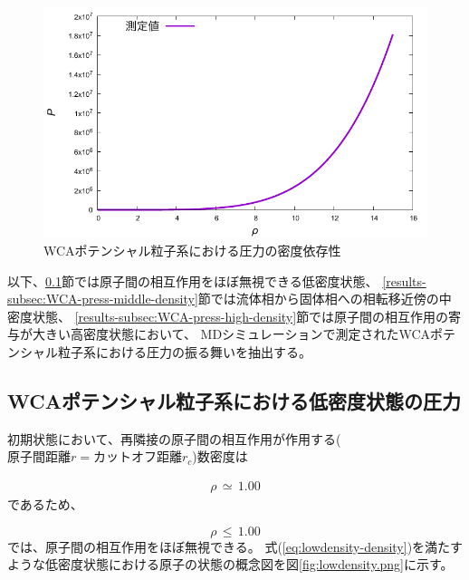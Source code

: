 \documentclass[titlepage]{jsreport}
\begin{document}
{{{\begin{figure}[htbp]
    \begin{center}
        \includegraphics[width=14cm]{fig/den-pre.pdf}
    \end{center}
    \caption{WCAポテンシャル粒子系における圧力の密度依存性}
    \label{fig:den-pre}
\end{figure}

\newpage
以下、\ref{results-subsec:WCA-press-low-density}節では原子間の相互作用をほぼ無視できる低密度状態、
\ref{results-subsec:WCA-press-middle-density}節では流体相から固体相への相転移近傍の中密度状態、
\ref{results-subsec:WCA-press-high-density}節では原子間の相互作用の寄与が大きい高密度状態において、
MDシミュレーションで測定されたWCAポテンシャル粒子系における圧力の振る舞いを抽出する。


\subsection{WCAポテンシャル粒子系における低密度状態の圧力}\label{results-subsec:WCA-press-low-density}
初期状態において、再隣接の原子間の相互作用が作用する($原子間距離r=カットオフ距離r_c$)数密度は

\large
\begin{eqnarray}
\rho\,{\simeq}\,1.00 \nonumber
\end{eqnarray}
\normalsize
であるため、

\large
\begin{equation}
\rho\,{\leq}\,1.00 \label{eq:lowdensity-density}
\end{equation}
\normalsize
では、原子間の相互作用をほぼ無視できる。
式(\ref{eq:lowdensity-density})を満たすような低密度状態における原子の状態の概念図を図\ref{fig:lowdensity.png}に示す。

}}}
\end{document}
